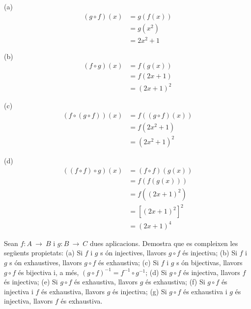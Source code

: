 \begin{solucio}
(a)
\begin{align*}
(g\circ f)(x)& =g\left( f(x)\right) \\
& =g(x^{2}) \\
& =2x^{2}+1
\end{align*}

(b)%
\begin{align*}
(f\circ g)(x)& =f\left( g(x)\right) \\
& =f(2x+1) \\
& =(2x+1)^{2}
\end{align*}

(c)%
\begin{align*}
\left( f\circ (g\circ f)\right) (x)& =f\left( (g\circ f)(x)\right) \\
& =f\left( 2x^{2}+1\right) \\
& =(2x^{2}+1)^{2}
\end{align*}

(d)%
\begin{align*}
\left( (f\circ f)\circ g\right) (x)& =(f\circ f)\left( g(x)\right) \\
& =f\left( f\left( g(x)\right) \right) \\
& =f\left( (2x+1)^{2}\right) \\
& =\left[ (2x+1)^{2}\right] ^{2} \\
& =(2x+1)^{4}
\end{align*}
\end{solucio}

\begin{exer}
Sean $f:A~\longrightarrow ~B$ i $g:B~\longrightarrow ~C$ dues aplicacions.
Demostra que es compleixen les seg\"{u}ents propietats: (a) Si $f$ i $g$ s%
\'{o}n injectives, llavors $g\circ f$ \'{e}s injectiva; (b) Si $f$ i $g$ s%
\'{o}n exhaustives, llavors $g\circ f$ \'{e}s exhaustiva; (c) Si $f$ i $g$ s%
\'{o}n bijectivas, llavors $g\circ f$ \'{e}s bijectiva i, a m\'{e}s, $%
(g\circ f)^{-1}=f^{-1}\circ g^{-1}$; (d) Si $g\circ f$ \'{e}s injectiva,
llavors $f$ \'{e}s injectiva; (e) Si $g\circ f$ \'{e}s exhaustiva, llavors $%
g $ \'{e}s exhaustiva; (f) Si $g\circ f$ \'{e}s injectiva i $f$ \'{e}s
exhaustiva, llavors $g$ \'{e}s injectiva; (g) Si $g\circ f$ \'{e}s
exhaustiva i $g$ \'{e}s injectiva, llavors $f$ \'{e}s exhaustiva.
\end{exer}

